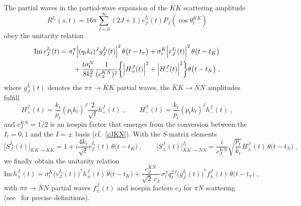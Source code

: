 \documentclass[11pt]{article}%
\providecommand{\ec}{\;,}
\providecommand{\nt}{\notag}
\newcommand{\tpi}{t_\pi}
\newcommand{\tK}{t_K}
\newcommand{\tN}{t_N}
\newcommand{\beq}{\begin{equation}}
\newcommand{\eeq}{\end{equation}}
\renewcommand{\Im}{\text{Im}\,}
\begin{document}
The partial waves in the partial-wave expansion of the $\bar K K$ scattering amplitude
\beq
R^{I_t}(s,t)=16\pi\sum\limits_{J=0}^\infty(2J+1)r^{I_t}_J(t)P_J(\cos\theta_t^{\bar K K})
\eeq 
obey the unitarity relation
\begin{align}
\Im r^{I_t}_J(t)&=\sigma^\pi_t\Big|(q_tk_t)^Jg_J^{I_t}(t)\Big|^2\,\theta\big(t-\tpi\big)+\sigma^K_t\Big|r_J^{I_t}(t)\Big|^2\,\theta\big(t-\tK\big)\nt\\
&\qquad+\frac{t\sigma^N_t}{8k_t^2}\frac{1}{(c^{KN}_J)^2}\bigg\{\Big|H_+^J(t)\Big|^2+\Big|H_-^J(t)\Big|^2\bigg\}\theta\big(t-\tN\big)\ec
\end{align}
where $g_J^{I_t}(t)$ denotes the $\pi\pi\to\bar K K$ partial waves, the $\bar K K\to\bar N N$ amplitudes fulfill
\beq
H_+^J(t)=\frac{k_t}{p_t}(p_tk_t)^J\frac{2}{\sqrt{t}}h_+^J(t)\ec\qquad
 H_-^J(t)=\frac{k_t}{p_t}(p_tk_t)^Jh_-^J(t)\ec
\eeq
and $c^{KN}_J=1/2$ is an isospin factor that emerges from the conversion between the $I_t=0,1$ and the $I=\pm$ basis (cf.~\eqref{cJKN}). 
With the $S$-matrix elements
\beq
\big[S^{I_t}_J(t)\big]_{\bar KK\to\bar KK}=1+i\frac{4k_t}{\sqrt{t}}r^{I_t}_J(t)\,\theta\big(t-\tK\big)\ec\qquad
\big[S^J_\pm(t)\big]^{I_t}_{\bar K K\to\bar NN}=\frac{i}{c_J^{KN}}\sqrt{\frac{p_t}{k_t}}H^J_\pm(t)\,\theta\big(t-\tN\big)\ec
\eeq
we finally obtain the unitarity relation
\beq
\Im h^J_{\pm}(t)=\sigma^K_t\big(r^{I_t}_J(t)\big)^*h^J_{\pm}(t)\,\theta\big(t-\tK\big)
+\frac{c_J^{KN}}{\sqrt{2}\,c_J}\,\sigma^\pi_tq_t^{2J}\big(g^{I_t}_J(t)\big)^*f_\pm^J(t)\,\theta\big(t-\tpi\big)\ec
\eeq
with $\pi\pi\to\bar N N$ partial waves $f_\pm^J(t)$ and isospin factors $c_J$ for $\pi N$ scattering (see~\cite{RS_DHKM} for precise definitions).
\end{document}
